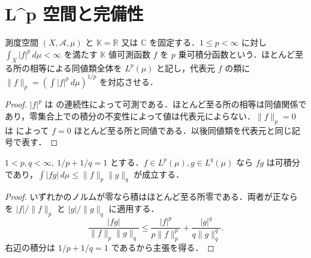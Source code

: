 \section{L^p 空間と完備性}
\begin{defn}[L^p 可積分函数と同値類]
測度空間 $(X,\mathcal A,\mu)$ と $\mathbb K=\mathbb R$ 又は $\mathbb C$ を固定する．$1\leq p<\infty$ に対し $\int_X|f|^p\,d\mu<\infty$ を満たす $\mathbb K$ 値可測函数 $f$ を $p$ 乗可積分函数という．ほとんど至る所の相等による同値類全体を $L^p(\mu)$ と記し，代表元 $f$ の類に $\|f\|_p=(\int |f|^p\,d\mu)^{1/p}$ を対応させる．
\end{defn}
\begin{proof}
$|f|^p$ は  の連続性によって可測である．ほとんど至る所の相等は同値関係であり，零集合上での積分の不変性によって値は代表元によらない．$\|f\|_p=0$ は  によって $f=0$ ほとんど至る所と同値である．以後同値類を代表元と同じ記号で表す．
\end{proof}
\begin{prop}[Hölderの不等式]
$1<p,q<\infty,\ 1/p+1/q=1$ とする．$f\in L^p(\mu),g\in L^q(\mu)$ なら $fg$ は可積分であり，$\int|fg|\,d\mu\leq\|f\|_p\|g\|_q$ が成立する．
\end{prop}
\begin{proof}
いずれかのノルムが零なら積はほとんど至る所零である．両者が正なら  を $|f|/\|f\|_p$ と $|g|/\|g\|_q$ に適用する．
\[
\frac{|fg|}{\|f\|_p\|g\|_q}
\leq\frac{|f|^p}{p\|f\|_p^p}+\frac{|g|^q}{q\|g\|_q^q}.
\]
右辺の積分は $1/p+1/q=1$ であるから主張を得る．
\end{proof}
